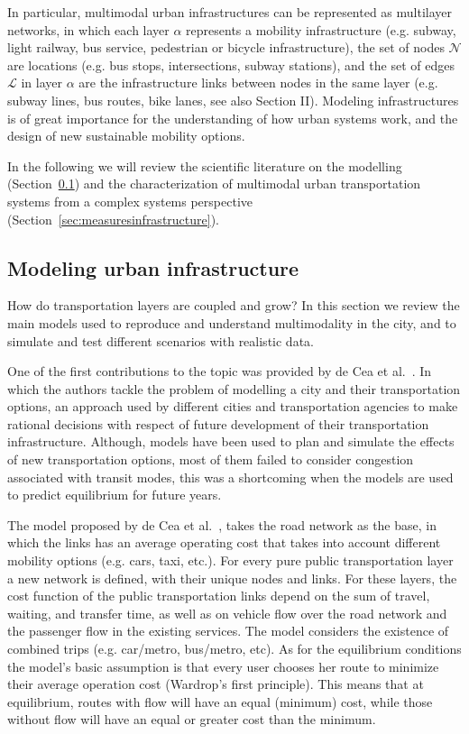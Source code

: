 In particular, multimodal urban infrastructures can be represented as multilayer networks, in which each layer $\alpha$ represents a mobility infrastructure (e.g. subway, light railway, bus service, pedestrian or bicycle infrastructure), the set of nodes $\mathcal{N}$ are locations (e.g. bus stops, intersections, subway stations), and the set of edges $\mathcal{L}$ in layer $\alpha$ are the infrastructure links between nodes in the same layer (e.g. subway lines, bus routes, bike lanes, see also Section II).
Modeling infrastructures is of great importance for the understanding of how urban systems work, and the design of new sustainable mobility options. 

In the following we will review the scientific literature on the modelling (Section~\ref{sec:modelinginsrastructure}) and the characterization of multimodal urban transportation systems from a complex systems perspective (Section~\ref{sec:measuresinfrastructure}).


\subsection{Modeling urban infrastructure}\label{sec:modelinginsrastructure}

How do transportation layers are coupled and grow?
In this section we review the main models used to reproduce and understand multimodality in the city, and to simulate and test different scenarios with realistic data. 

One of the first contributions to the topic was provided by de Cea et al.~\cite{decea2005equilibrium}. In which the authors tackle the problem of modelling a city and their transportation options, an approach used by different cities and transportation agencies to make rational decisions with respect of future development of their transportation infrastructure. Although, models have been used to plan and simulate the effects of new transportation options, most of them failed to consider congestion associated with transit modes, this was a shortcoming when the models are used to predict equilibrium for future years. 

The model proposed by de Cea et al.~\cite{decea2005equilibrium}, takes the road network as the base, in which the links has an average operating cost that takes into account different mobility options (e.g. cars, taxi, etc.). For every pure public transportation layer a new network is defined, with their unique nodes and links. For these layers, the cost function of the public transportation links depend on the sum of travel, waiting, and transfer time, as well as on vehicle flow over the road network and the passenger flow in the existing services. The model considers the existence of combined trips (e.g. car/metro, bus/metro, etc). As for the equilibrium conditions the model's basic assumption is that every user chooses her route to minimize their average operation cost (Wardrop’s first principle). This means that at equilibrium, routes with flow will have an equal (minimum) cost, while those without flow will have an equal or greater cost than the minimum.

